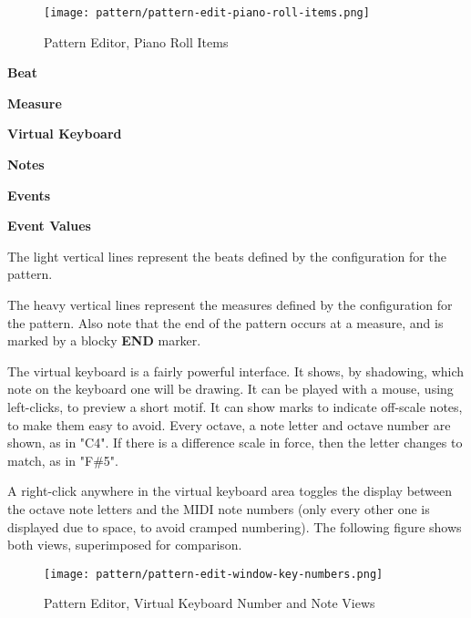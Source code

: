 \begin{figure}[H]
   \centering 
   \texttt{[image: pattern/pattern-edit-piano-roll-items.png]}
   \caption{Pattern Editor, Piano Roll Items}
   \label{fig:pattern_editor_piano_roll_items}
\end{figure}

   \begin{enumber}
      \item \textbf{Beat}
      \item \textbf{Measure}
      \item \textbf{Virtual Keyboard}
      \item \textbf{Notes}
      \item \textbf{Events}
      \item \textbf{Event Values}
   \end{enumber}

   \setcounter{ItemCounter}{0}      %

   The light vertical lines represent the beats defined by the configuration
   for the pattern.

   The heavy vertical lines represent the measures defined by the
   configuration for the pattern.
   Also note that the end of the pattern
   occurs at a measure, and is marked by a blocky \textbf{END} marker.

   The virtual keyboard is a fairly powerful interface.  It shows,
   by shadowing, which note on the keyboard one will be drawing. It can be
   played with a mouse, using left-clicks, to preview a short motif.
   It can show marks to indicate off-scale notes, to make them easy to
   avoid.  Every octave, a note letter and octave number are shown, as in
   "C4".  If there is a difference scale in force, then the letter changes to
   match, as in "F\#5".

   A right-click anywhere in the virtual keyboard area toggles the display
   between the octave note letters and the MIDI note numbers (only every other
   one is displayed due to space, to avoid cramped numbering).
   The following figure shows both views, superimposed for comparison.

\begin{figure}[H]
   \centering 
   \texttt{[image: pattern/pattern-edit-window-key-numbers.png]}
   \caption{Pattern Editor, Virtual Keyboard Number and Note Views}
   \label{fig:pattern_editor_key_numbers}
\end{figure}

